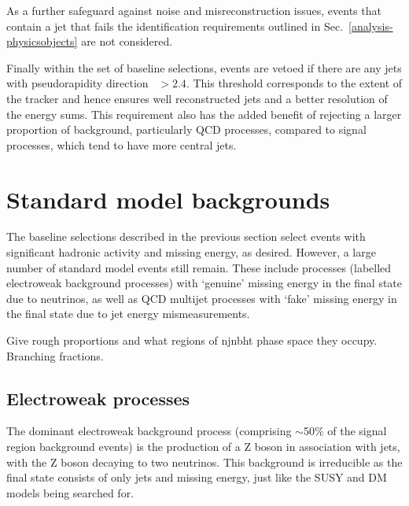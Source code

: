 As a further safeguard against noise and misreconstruction issues, events that 
contain a jet that fails the identification requirements outlined in 
Sec.~\ref{analysis-physicsobjects} are not considered.

Finally within the set of baseline selections, events are vetoed if there are 
any jets with pseudorapidity direction \etaabs~$>2.4$. This threshold 
corresponds to the extent of the tracker and hence ensures well reconstructed 
jets and a better resolution of the energy sums. This requirement also has the 
added benefit of rejecting a larger proportion of background, particularly QCD 
processes, compared to signal processes, which tend to have more central 
jets.

\section{Standard model backgrounds}

The baseline selections described in the previous section select events with 
significant hadronic activity and missing energy, as desired. However, a large 
number of standard model events still remain. These include processes (labelled 
electroweak background processes) with `genuine' missing energy in the final 
state due to neutrinos, as well as QCD multijet processes with `fake' missing 
energy in the final state due to jet energy mismeasurements.

Give rough proportions and what regions of njnbht phase space they occupy. 
Branching fractions.

\subsection{Electroweak processes}

The dominant electroweak background process (comprising $\sim$50\% of the 
signal region background events) is the production of a Z boson in 
association with jets, with the Z boson decaying to two neutrinos. This 
background is irreducible as the final state consists of only jets and missing 
energy, just like the SUSY and DM models being searched for.

